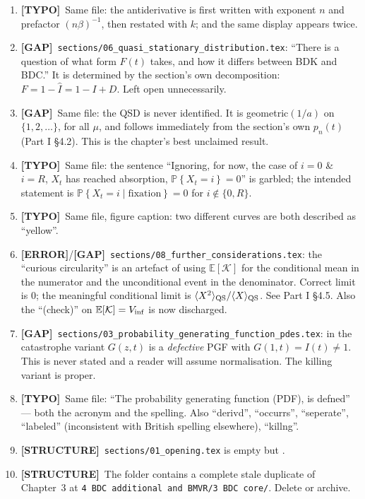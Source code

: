 \documentclass[11pt]{article}
\newcommand{\E}{\mathbb{E}}
\newcommand{\Prob}[1]{\mathbb{P}\!\left\{#1\right\}}
\newcommand{\xt}{X_t}
\newcommand{\Ihat}{\widehat{I}}
\newcommand{\Kb}{\mathcal{K}}
\theoremstyle{plain}
\theoremstyle{definition}
\theoremstyle{remark}
\newcommand{\ERR}{\textcolor{red!70!black}{\textbf{[ERROR]}}}
\newcommand{\GAP}{\textcolor{orange!80!black}{\textbf{[GAP]}}}
\newcommand{\TYP}{\textcolor{gray!80!black}{\textbf{[TYPO]}}}
\newcommand{\STR}{\textcolor{purple!70!black}{\textbf{[STRUCTURE]}}}
\begin{document}
\begin{enumerate}[leftmargin=2.2em,label=\textbf{4.\arabic*}]
\item \TYP\ Same file: the antiderivative is first written with exponent $n$ and prefactor
$(n\beta)^{-1}$, then restated with $k$; and the same display appears twice.

\item \GAP\ \texttt{sections/06\_quasi\_stationary\_distribution.tex}: ``There is a
question of what form $F(t)$ takes, and how it differs between BDK and BDC.'' It is
determined by the section's own decomposition: $F=1-\Ihat=1-I+D$. Left open
unnecessarily.

\item \GAP\ Same file: the QSD is never identified. It is geometric$(1/a)$ on
$\{1,2,\dots\}$, for all $\mu$, and follows immediately from the section's own $p_n(t)$
(Part I \S4.2). This is the chapter's best unclaimed result.

\item \TYP\ Same file: the sentence ``Ignoring, for now, the case of $i=0$ \& $i=R$,
$\xt$ has reached absorption, $\Prob{\xt=i}=0$'' is garbled; the intended statement is
$\Prob{\xt=i\mid\text{fixation}}=0$ for $i\notin\{0,R\}$.

\item \TYP\ Same file, figure caption: two different curves are both described as
``yellow''.

\item \ERR/\GAP\ \texttt{sections/08\_further\_considerations.tex}: the ``curious
circularity'' is an artefact of using $\E[\Kb]$ for the conditional mean in the numerator
and the unconditional event in the denominator. Correct limit is $0$; the meaningful
conditional limit is $\langle X^2\rangle_{\rm QS}/\langle X\rangle_{\rm QS}$.
See Part I \S4.5. Also the ``(check)'' on $\E[\Kb]=V_{\rm inf}$ is now discharged.

\item \GAP\ \texttt{sections/03\_probability\_generating\_function\_pdes.tex}: in the
catastrophe variant $G(z,t)$ is a \emph{defective} PGF with $G(1,t)=I(t)\neq1$. This is
never stated and a reader will assume normalisation. The killing variant is proper.

\item \TYP\ Same file: ``The probability generating function (PDF), is defned'' --- both
the acronym and the spelling. Also ``derivd'', ``occurrs'', ``seperate'', ``labeled''
(inconsistent with British spelling elsewhere), ``killng''.

\item \STR\ \texttt{sections/01\_opening.tex} is empty but \verb||.

\item \STR\ The folder contains a complete stale duplicate of Chapter~3 at
\texttt{4 BDC additional and BMVR/3 BDC core/}. Delete or archive.
\end{enumerate}
\end{document}
